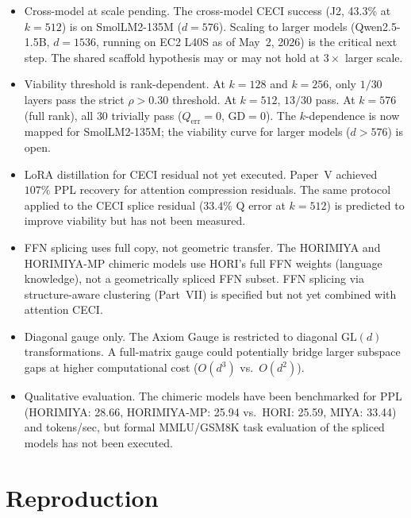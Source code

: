 \documentclass[11pt]{article}
\begin{document}
\begin{itemize}
\item Cross-model at scale pending.  The cross-model CECI success
      (J2, 43.3\% at $k{=}512$) is on SmolLM2-135M ($d{=}576$).  Scaling
      to larger models (Qwen2.5-1.5B, $d{=}1536$, running on EC2 L40S as
      of May~2, 2026) is the critical next step.  The shared scaffold
      hypothesis may or may not hold at $3\times$ larger scale.

\item Viability threshold is rank-dependent.  At $k{=}128$ and
      $k{=}256$, only $1/30$ layers pass the strict $\rho{>}0.30$ threshold.
      At $k{=}512$, $13/30$ pass.  At $k{=}576$ (full rank), all $30$
      trivially pass ($Q_{\text{err}}{=}0$, GD${=}0$).  The $k$-dependence
      is now mapped for SmolLM2-135M; the viability curve for larger models
      ($d{>}576$) is open.

\item LoRA distillation for CECI residual not yet executed.
      Paper~V achieved $107\%$ PPL recovery for attention compression
      residuals.  The same protocol applied to the CECI splice residual
      ($33.4\%$ Q error at $k{=}512$) is predicted to improve viability but
      has not been measured.

\item FFN splicing uses full copy, not geometric transfer.  The
      HORIMIYA and HORIMIYA-MP chimeric models use HORI's full FFN weights
      (language knowledge), not a geometrically spliced FFN subset.  FFN
      splicing via structure-aware clustering (Part~VII) is specified but
      not yet combined with attention CECI.

\item Diagonal gauge only.  The Axiom Gauge is restricted to
      diagonal $\mathrm{GL}(d)$ transformations.  A full-matrix gauge
      could potentially bridge larger subspace gaps at higher
      computational cost ($O(d^3)$ vs.\ $O(d^2)$).

\item Qualitative evaluation.  The chimeric models have been
      benchmarked for PPL (HORIMIYA: 28.66, HORIMIYA-MP: 25.94 vs.\
      HORI: 25.59, MIYA: 33.44) and tokens/sec, but formal MMLU/GSM8K
      task evaluation of the spliced models has not been executed.
\end{itemize}

\section{Reproduction}\label{sec:repro}
\end{document}
